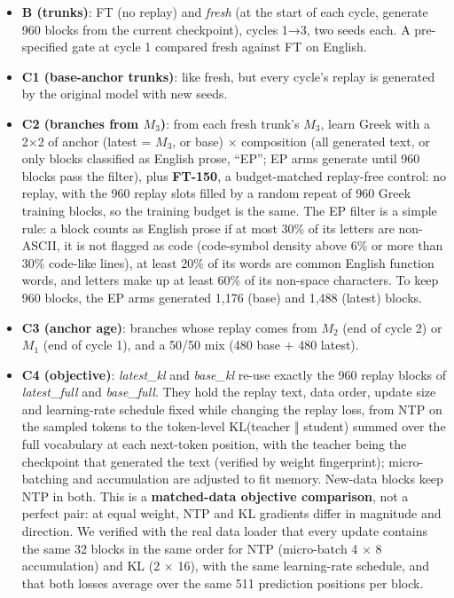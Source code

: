 \documentclass[11pt]{article}
\begin{document}
\begin{itemize}
\item \textbf{B (trunks)}: FT (no replay) and \emph{fresh} (at the start of each cycle, generate 960 blocks from the current checkpoint), cycles 1→3, two seeds each. A pre-specified gate at cycle 1 compared fresh against FT on English.
\item \textbf{C1 (base-anchor trunks)}: like fresh, but every cycle's replay is generated by the original model with new seeds.
\item \textbf{C2 (branches from $M_3$)}: from each fresh trunk's $M_3$, learn Greek with a 2×2 of anchor (latest = $M_3$, or base) × composition (all generated text, or only blocks classified as English prose, ``EP''; EP arms generate until 960 blocks pass the filter), plus \textbf{FT-150}, a budget-matched replay-free control: no replay, with the 960 replay slots filled by a random repeat of 960 Greek training blocks, so the training budget is the same. The EP filter is a simple rule: a block counts as English prose if at most 30\% of its letters are non-ASCII, it is not flagged as code (code-symbol density above 6\% or more than 30\% code-like lines), at least 20\% of its words are common English function words, and letters make up at least 60\% of its non-space characters. To keep 960 blocks, the EP arms generated 1,176 (base) and 1,488 (latest) blocks.
\item \textbf{C3 (anchor age)}: branches whose replay comes from $M_2$ (end of cycle 2) or $M_1$ (end of cycle 1), and a 50/50 mix (480 base + 480 latest).
\item \textbf{C4 (objective)}: \emph{latest\_kl} and \emph{base\_kl} re-use exactly the 960 replay blocks of \emph{latest\_full} and \emph{base\_full}. They hold the replay text, data order, update size and learning-rate schedule fixed while changing the replay loss, from NTP on the sampled tokens to the token-level KL(teacher ‖ student) summed over the full vocabulary at each next-token position, with the teacher being the checkpoint that generated the text (verified by weight fingerprint); micro-batching and accumulation are adjusted to fit memory. New-data blocks keep NTP in both. This is a \textbf{matched-data objective comparison}, not a perfect pair: at equal weight, NTP and KL gradients differ in magnitude and direction. We verified with the real data loader that every update contains the same 32 blocks in the same order for NTP (micro-batch 4 × 8 accumulation) and KL (2 × 16), with the same learning-rate schedule, and that both losses average over the same 511 prediction positions per block.
\end{itemize}
\end{document}
